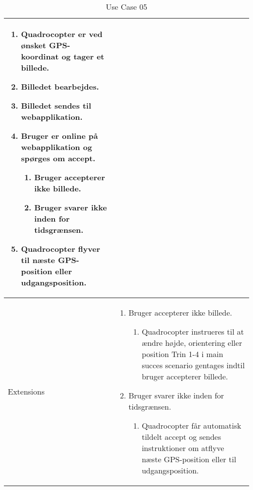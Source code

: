\begin{table}[H]
\begin{tabular}{|l|p{10cm}|}
									\begin{enumerate}[topsep=0.0cm, leftmargin=0.5cm]
										\item Quadrocopter er ved ønsket GPS-koordinat og tager et billede.
										\item Billedet bearbejdes.
										\item Billedet sendes til webapplikation.
										\item Bruger er online på webapplikation og spørges om accept.
											\begin{enumerate}[partopsep=4cm, topsep=0cm, leftmargin=1cm]
												\item Bruger accepterer ikke billede.
												\item Bruger svarer ikke inden for tidsgrænsen.
											\end{enumerate}
										\item Quadrocopter flyver til næste GPS-position eller udgangsposition.
									\end{enumerate} \\\hline	

Extensions							& 

									\renewcommand{\labelenumi}{\Roman{enumi}:}
									\renewcommand{\labelenumii}{\alph{enumii})}
									\begin{enumerate}[topsep=0.0cm,leftmargin=0.5cm]
										\item Bruger accepterer ikke billede.
											\begin{enumerate}[topsep=0cm, leftmargin=1cm]
												\item Quadrocopter instrueres til at ændre højde, orientering eller position Trin 1-4 i main succes scenario gentages indtil bruger accepterer billede.
											\end{enumerate}
										\item Bruger svarer ikke inden for tidsgrænsen.
											\begin{enumerate}[topsep=0cm, leftmargin=1cm]
												\item Quadrocopter får automatisk tildelt accept og sendes instruktioner om atflyve næste GPS-position eller til udgangsposition.
											\end{enumerate}
									\end{enumerate} \\\hline	

\end{tabular}
\caption{Use Case 05}
\label{tab:UC05}
\end{table}